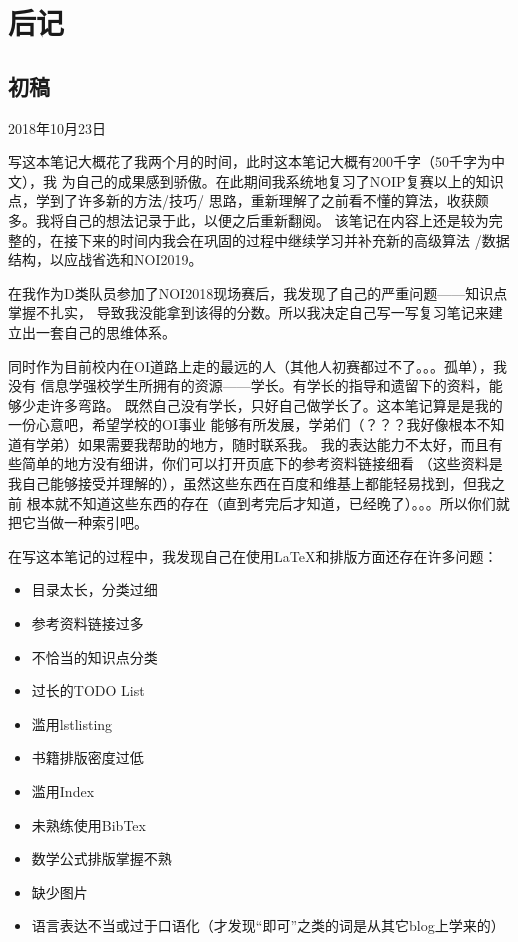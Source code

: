 \chapter{后记}
\section{初稿}
2018年10月23日

写这本笔记大概花了我两个月的时间，此时这本笔记大概有200千字（50千字为中文），我
为自己的成果感到骄傲。在此期间我系统地复习了NOIP复赛以上的知识点，学到了许多新的方法/技巧/
思路，重新理解了之前看不懂的算法，收获颇多。我将自己的想法记录于此，以便之后重新翻阅。
该笔记在内容上还是较为完整的，在接下来的时间内我会在巩固的过程中继续学习并补充新的高级算法
/数据结构，以应战省选和NOI2019。

在我作为D类队员参加了NOI2018现场赛后，我发现了自己的严重问题------知识点掌握不扎实，
导致我没能拿到该得的分数。所以我决定自己写一写复习笔记来建立出一套自己的思维体系。

同时作为目前校内在OI道路上走的最远的人（其他人初赛都过不了。。。孤单），我没有
信息学强校学生所拥有的资源——学长。有学长的指导和遗留下的资料，能够少走许多弯路。
既然自己没有学长，只好自己做学长了。这本笔记算是是我的一份心意吧，希望学校的OI事业
能够有所发展，学弟们（？？？我好像根本不知道有学弟）如果需要我帮助的地方，随时联系我。
我的表达能力不太好，而且有些简单的地方没有细讲，你们可以打开页底下的参考资料链接细看
（这些资料是我自己能够接受并理解的），虽然这些东西在百度和维基上都能轻易找到，但我之前
根本就不知道这些东西的存在（直到考完后才知道，已经晚了）。。。所以你们就把它当做一种索引吧。

在写这本笔记的过程中，我发现自己在使用\LaTeX{}和排版方面还存在许多问题：
\begin{itemize}
    \item 目录太长，分类过细
    \item 参考资料链接过多
    \item 不恰当的知识点分类
    \item 过长的TODO List
    \item 滥用lstlisting
    \item 书籍排版密度过低
    \item 滥用Index
    \item 未熟练使用BibTex
    \item 数学公式排版掌握不熟
    \item 缺少图片
    \item 语言表达不当或过于口语化（才发现``即可''之类的词是从其它blog上学来的）
\end{itemize}

